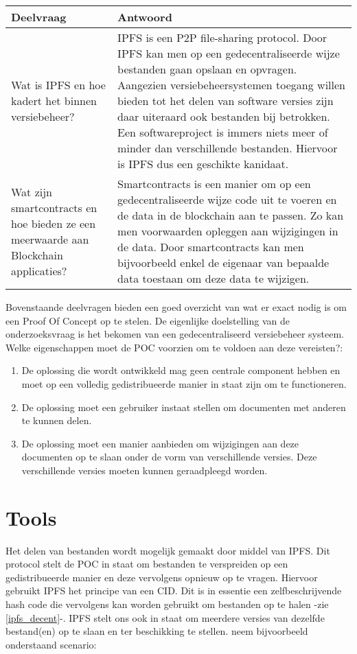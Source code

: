 \begin{table}[h!]
\begin{tabularx}{\linewidth}{ |X|X| }
\hline
Deelvraag & Antwoord \\ \hline
Wat is IPFS en hoe kadert het binnen versiebeheer? & IPFS is een P2P file-sharing protocol. Door IPFS kan men op een gedecentraliseerde wijze bestanden gaan opslaan en opvragen. Aangezien versiebeheersystemen toegang willen bieden tot het delen van software versies zijn daar uiteraard ook bestanden bij betrokken. Een softwareproject is immers niets meer of minder dan verschillende bestanden. Hiervoor is IPFS dus een geschikte kanidaat.\\ \hline
Wat zijn smartcontracts en hoe bieden ze een meerwaarde aan Blockchain applicaties? & Smartcontracts is een manier om op een gedecentraliseerde wijze code uit te voeren en de data in de blockchain aan te passen. Zo kan men voorwaarden opleggen aan wijzigingen in de data. Door smartcontracts kan men bijvoorbeeld enkel de eigenaar van bepaalde data toestaan om deze data te wijzigen.\\ \hline
\end{tabularx}
\end{table} 
\newpage
\newpage
Bovenstaande deelvragen bieden een goed overzicht van wat er exact nodig is om een Proof Of Concept op te stelen. De eigenlijke doelstelling van de onderzoeksvraag is het bekomen van een gedecentraliseerd versiebeheer systeem. Welke eigenschappen moet de POC voorzien om te voldoen aan deze vereisten?:

\begin{enumerate}
	\item De oplossing die wordt ontwikkeld mag geen centrale component hebben en moet op een volledig gedistribueerde manier in staat zijn om te functioneren.
	\item De oplossing moet een gebruiker instaat stellen om documenten met anderen te kunnen delen.
	\item De oplossing moet een manier aanbieden om wijzigingen aan deze documenten op te slaan onder de vorm van verschillende versies. Deze verschillende versies moeten kunnen geraadpleegd worden.
\end{enumerate}

\section{Tools}
\label{Tools}
Het delen van bestanden wordt mogelijk gemaakt door middel van IPFS. Dit protocol stelt de POC in staat om bestanden te verspreiden op een gedistribueerde manier en deze vervolgens opnieuw op te vragen. Hiervoor gebruikt IPFS het principe van een CID. Dit is in essentie een zelfbeschrijvende hash code die vervolgens kan worden gebruikt om bestanden op te halen -zie \ref{ipfs_decent}-. IPFS stelt ons ook in staat om meerdere versies van dezelfde bestand(en) op te slaan en ter beschikking te stellen. neem bijvoorbeeld onderstaand scenario:\\

